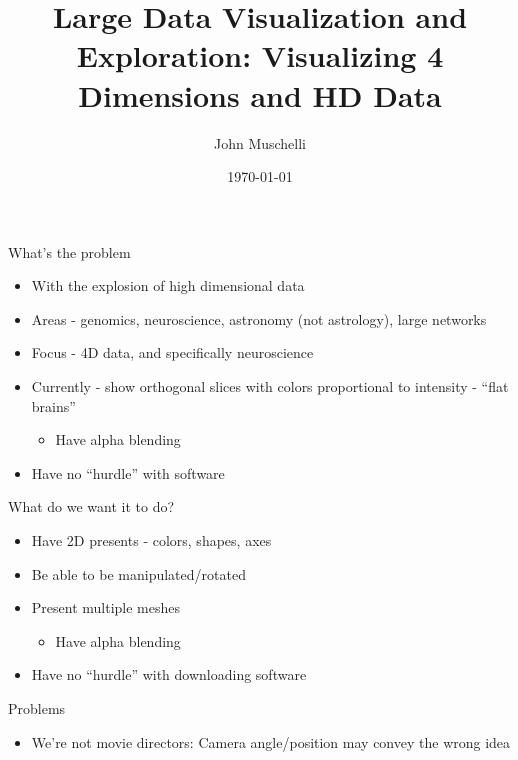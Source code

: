\documentclass[10pt,a4paper]{beamer}
\title{Large Data Visualization and Exploration: Visualizing 4 Dimensions and HD Data}
\subtitle{} %
\author{John Muschelli}
\date{\today}
\begin{document}
\begin{frame}
  \titlepage
\end{frame}

\begin{frame}{What's the problem}%
\begin{itemize}
\item With the explosion of high dimensional data
\item Areas - genomics, neuroscience, astronomy (not astrology), large networks
\item Focus - 4D data, and specifically neuroscience 
\item Currently - show orthogonal slices with colors proportional to intensity - ``flat brains''
\begin{itemize}
\item Have alpha blending
\end{itemize}
\item Have no ``hurdle'' with software
\end{itemize}
\end{frame}

\begin{frame}{What do we want it to do?}%
\begin{itemize}
\item Have 2D presents - colors, shapes, axes
\item Be able to be manipulated/rotated
\item Present multiple meshes
\begin{itemize}
\item Have alpha blending
\end{itemize}
\item Have no ``hurdle'' with downloading software
\end{itemize}
\end{frame}


\begin{frame}{Problems}%
\begin{itemize}
\item We're not movie directors: Camera angle/position may convey the wrong idea
\end{itemize}
\end{frame}
\end{document}
